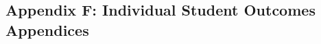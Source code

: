 \documentclass[12pt]{article}
\begin{document}
\subsection*{Appendix F: Individual Student Outcomes Appendices}

\end{document}
